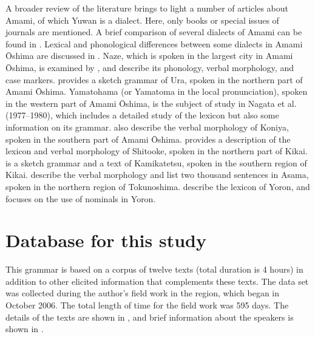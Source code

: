 A broader review of the literature brings to light a number of articles about Amami, of which Yuwan is a dialect. Here, only books or special issues of journals are mentioned. A brief comparison of several dialects of Amami can be found in \citet{HirayamaEtAl1966}. Lexical and phonological differences between some dialects in Amami Ōshima are discussed in \citet{Shibata1984}. Naze, which is spoken in the largest city in Amami Ōshima, is examined by \citet{Terashi1985}, and \citet{UemuraSuyama1997} describe its phonology, verbal morphology, and case markers. \citet{Shigeno2010} provides a sketch grammar of Ura, spoken in the northern part of Amami Ōshima. Yamatohama (or Yamatoma in the local pronunciation), spoken in the western part of Amami Ōshima, is the subject of study in Nagata et al. (1977–1980), which includes a detailed study of the lexicon but also some information on its grammar. \citet{UchimaEtAl1976} also describe the verbal morphology of Koniya, spoken in the southern part of Amami Ōshima. \citet{NakamotoUchima1978} provides a description of the lexicon and verbal morphology of Shitooke, spoken in the northern part of Kikai. \citet{ShirataEtAl2011} is a sketch grammar and a text of Kamikatetsu, spoken in the southern region of Kikai. \citet{OkamuraEtAl2009} describe the verbal morphology and list two thousand sentences in Asama, spoken in the northern region of Tokunoshima. \citet{KikuTakahashi2005} describe the lexicon of Yoron, and \citet{Yamada1981} focuses on the use of nominals in Yoron.

\section{Database for this study}
\label{bkm:Ref347173399}\hypertarget{RefHeadingToc395696958}{}
This grammar is based on a corpus of twelve texts (total duration is 4 hours) in addition to other elicited information that complements these texts. The data set was collected during the author’s field work in the region, which began in October 2006. The total length of time for the field work was 595 days. The details of the texts are shown in , and brief information about the speakers is shown in .

